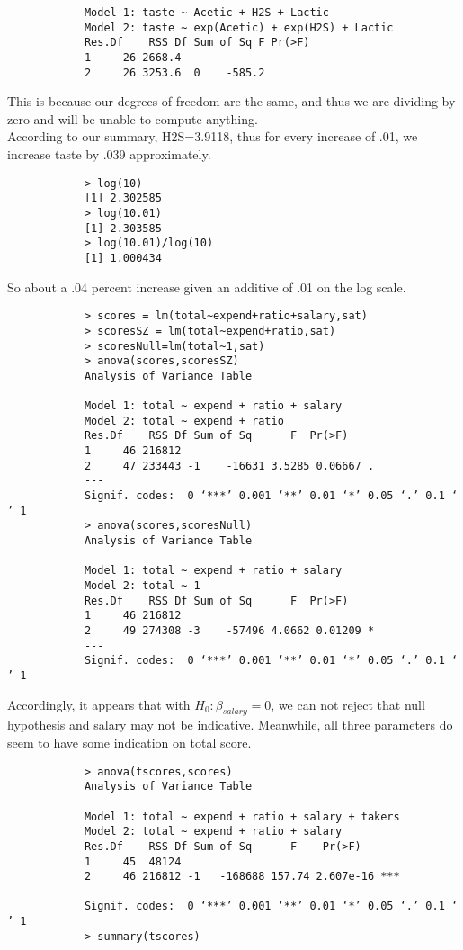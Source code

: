 \documentclass[12pt]{article}
\begin{document}
\begin{enumerate}
\begin{verbatim}
			Model 1: taste ~ Acetic + H2S + Lactic
			Model 2: taste ~ exp(Acetic) + exp(H2S) + Lactic
			Res.Df    RSS Df Sum of Sq F Pr(>F)
			1     26 2668.4                      
			2     26 3253.6  0    -585.2    
		\end{verbatim}
		This is because our degrees of freedom are the same, and thus we are dividing by zero and will be unable to compute anything.\\
		According to our summary, H2S=3.9118, thus for every increase of .01, we increase taste by .039 approximately.
		\begin{verbatim}
			> log(10)
			[1] 2.302585
			> log(10.01)
			[1] 2.303585
			> log(10.01)/log(10)
			[1] 1.000434
		\end{verbatim}
		So about a .04 percent increase given an additive of .01 on the log scale.	
		\begin{verbatim}
			> scores = lm(total~expend+ratio+salary,sat)
			> scoresSZ = lm(total~expend+ratio,sat)
			> scoresNull=lm(total~1,sat)
			> anova(scores,scoresSZ)
			Analysis of Variance Table
			
			Model 1: total ~ expend + ratio + salary
			Model 2: total ~ expend + ratio
			Res.Df    RSS Df Sum of Sq      F  Pr(>F)  
			1     46 216812                              
			2     47 233443 -1    -16631 3.5285 0.06667 .
			---
			Signif. codes:  0 ‘***’ 0.001 ‘**’ 0.01 ‘*’ 0.05 ‘.’ 0.1 ‘ ’ 1
			> anova(scores,scoresNull)
			Analysis of Variance Table
			
			Model 1: total ~ expend + ratio + salary
			Model 2: total ~ 1
			Res.Df    RSS Df Sum of Sq      F  Pr(>F)  
			1     46 216812                              
			2     49 274308 -3    -57496 4.0662 0.01209 *
			---
			Signif. codes:  0 ‘***’ 0.001 ‘**’ 0.01 ‘*’ 0.05 ‘.’ 0.1 ‘ ’ 1
		\end{verbatim}
		Accordingly, it appears that with $H_0:\beta_{salary}=0$, we can not reject that null hypothesis and salary may not be indicative. Meanwhile, all three parameters do seem to have some indication on total score.
		\begin{verbatim}
			> anova(tscores,scores)
			Analysis of Variance Table
			
			Model 1: total ~ expend + ratio + salary + takers
			Model 2: total ~ expend + ratio + salary
			Res.Df    RSS Df Sum of Sq      F    Pr(>F)    
			1     45  48124                                  
			2     46 216812 -1   -168688 157.74 2.607e-16 ***
			---
			Signif. codes:  0 ‘***’ 0.001 ‘**’ 0.01 ‘*’ 0.05 ‘.’ 0.1 ‘ ’ 1
			> summary(tscores)
			

\end{verbatim}
\end{enumerate}
\end{document}
